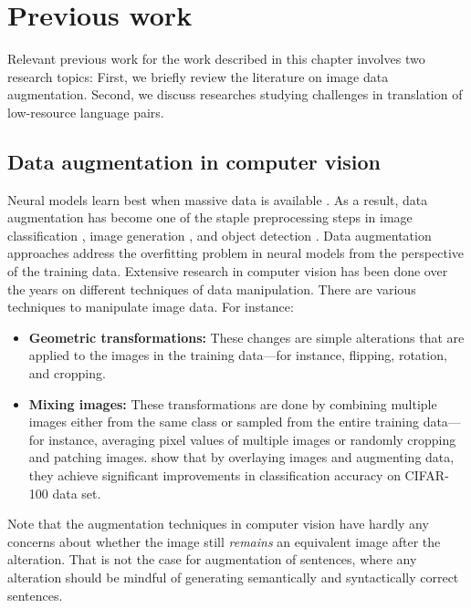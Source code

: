 \section{Previous work} \label{tda:background}

Relevant previous work for the work described in this chapter involves two research topics: 
First, we briefly review the literature on image data augmentation.
Second, we discuss researches studying challenges in translation of low-resource language pairs.

\subsection{Data augmentation in computer vision}

Neural models learn best when massive data is available \citep{Halevy:2009:UED:1525642.1525689}.
As a result, data augmentation has become one of the staple preprocessing steps in image classification \citep{NIPS2012_4824,huang2018gpipe, cubuk2019autoaugment}, image generation \citep{kynkaanniemi2019improved,karras2019style}, and object detection \citep{singh2018sniper,liu2016ssd}.
Data augmentation approaches address the overfitting problem in neural models from the perspective of the training data. 
Extensive research in computer vision has been done over the years on different techniques of data manipulation. 
There are various techniques to manipulate image data. For instance:

\begin{itemize}
 \item \textbf{Geometric transformations:} These changes are simple alterations that are applied to the images in the training data---for instance, flipping, rotation, and cropping. 
    
    \item \textbf{Mixing images:} These transformations are done by combining multiple images either from the same class or sampled from the entire training data---for instance, averaging pixel values of multiple images or randomly cropping and patching images. \citet{inoue2018data} show that by overlaying images and augmenting data, they achieve significant improvements in classification accuracy on CIFAR-100 data set.
\end{itemize}

Note that the augmentation techniques in computer vision have hardly any concerns about whether the image still \textit{remains} an equivalent image after the alteration. 
That is not the case for augmentation of sentences, where any alteration should be mindful of generating semantically and syntactically correct sentences. 

